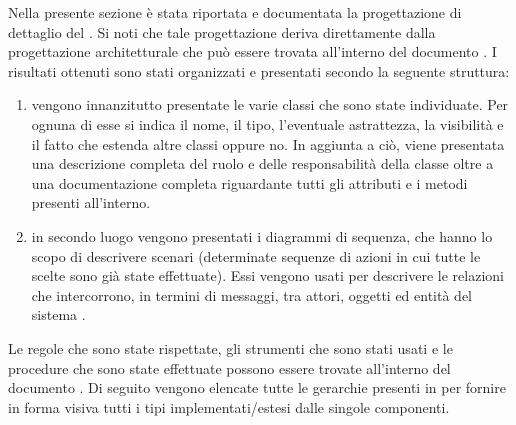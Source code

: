 	Nella presente sezione è stata riportata e documentata la progettazione di dettaglio del  . Si noti che tale progettazione deriva direttamente dalla progettazione architetturale che può essere trovata all'interno del documento . I risultati ottenuti sono stati organizzati e presentati secondo la seguente struttura:
	\begin{enumerate}
		\item vengono innanzitutto presentate le varie classi che sono state individuate. Per ognuna di esse si indica il nome, il tipo, l'eventuale astrattezza, la visibilità e il fatto che estenda altre classi oppure no. In aggiunta a ciò, viene presentata una descrizione completa del ruolo e delle responsabilità della classe oltre a una documentazione completa riguardante tutti gli attributi e i metodi presenti all'interno.
		\item in secondo luogo vengono presentati i diagrammi di sequenza, che hanno lo scopo di descrivere scenari (determinate sequenze di azioni in cui tutte le scelte sono già state effettuate). Essi vengono usati per descrivere le relazioni che intercorrono, in termini di messaggi, tra attori, oggetti ed entità del sistema .
	\end{enumerate}
	Le regole che sono state rispettate, gli strumenti che sono stati usati e le procedure che sono state effettuate possono essere trovate all'interno del documento .
		Di seguito vengono elencate tutte le gerarchie presenti in  per fornire in forma visiva tutti i tipi implementati/estesi dalle singole componenti.
